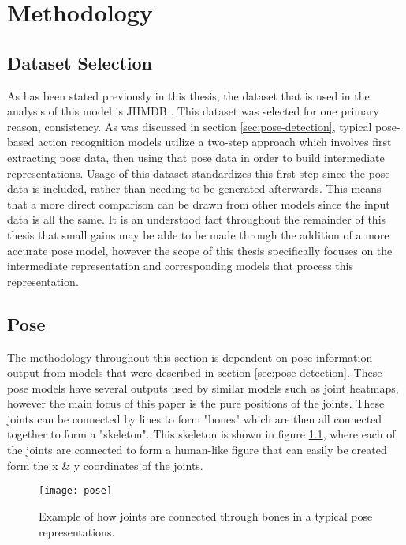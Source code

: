 
\chapter{Methodology}

\label{Methodology}

\section{Dataset Selection}

As has been stated previously in this thesis, the dataset that is used in the analysis of this model is JHMDB \cite{JHMDB}. This dataset was selected for one primary reason, consistency. As was discussed in section \ref{sec:pose-detection}, typical pose-based action recognition models utilize a two-step approach which involves first extracting pose data, then using that pose data in order to build intermediate representations. Usage of this dataset standardizes this first step since the pose data is included, rather than needing to be generated afterwards. This means that a more direct comparison can be drawn from other models since the input data is all the same. It is an understood fact throughout the remainder of this thesis that small gains may be able to be made through the addition of a more accurate pose model, however the scope of this thesis specifically focuses on the intermediate representation and corresponding models that process this representation.

\section{Pose}

The methodology throughout this section is dependent on pose information output from models that were described in section \ref{sec:pose-detection}. These pose models have several outputs used by similar models such as joint heatmaps, however the main focus of this paper is the pure positions of the joints. These joints can be connected by lines to form "bones" which are then all connected together to form a "skeleton". This skeleton is shown in figure \ref{fig:pose}, where each of the joints are connected to form a human-like figure that can easily be created form the x \& y coordinates of the joints.

\begin{figure}[ht]
	\texttt{[image: pose]}
	\centering
	\caption{Example of how joints are connected through bones in a typical pose representations.}
	\label{fig:pose}
\end{figure}

